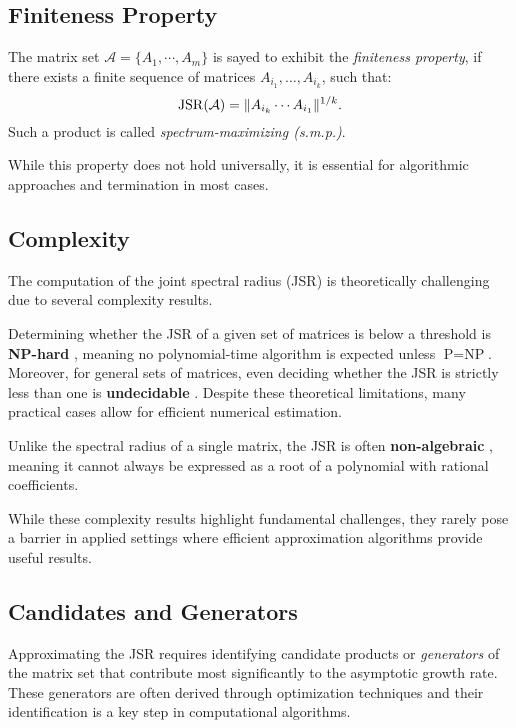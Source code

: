 \subsection*{Finiteness Property}
\begin{definition}
    The matrix set $\mathcal{A} = \{ A_1, \cdots, A_m\}$ is sayed to exhibit the \emph{finiteness property}, if there exists a finite sequence of matrices $A_{i_1}, \dots, A_{i_k}$, such that:
    \begin{equation}
    \operatorname{JSR}(\mathcal{A}) = \|A_{i_k} \cdots A_{i_1}\|^{1/k}.
    \end{equation}
    Such a product is called \emph{spectrum-maximizing (s.m.p.)}.
\end{definition}
While this property does not hold universally, it is essential for algorithmic approaches and termination in most cases.

\subsection*{Complexity}

The computation of the joint spectral radius (JSR) is theoretically challenging due to several complexity results.

Determining whether the JSR of a given set of matrices is below a threshold is \textbf{NP-hard} \citep{tsitsiklis1997lyapunov}, meaning no polynomial-time algorithm is expected unless $\text{P} = \text{NP}$. Moreover, for general sets of matrices, even deciding whether the JSR is strictly less than one is \textbf{undecidable} \citep{blondel2000boundedness}. Despite these theoretical limitations, many practical cases allow for efficient numerical estimation.

Unlike the spectral radius of a single matrix, the JSR is often \textbf{non-algebraic} \citep{guglielmiExactComputationJoint2011}, meaning it cannot always be expressed as a root of a polynomial with rational coefficients.

While these complexity results highlight fundamental challenges, they rarely pose a barrier in applied settings where efficient approximation algorithms provide useful results.

\subsection*{Candidates and Generators}
Approximating the JSR requires identifying candidate products or \emph{generators} of the matrix set that contribute most significantly to the asymptotic growth rate. These generators are often derived through optimization techniques and their identification is a key step in computational algorithms.

